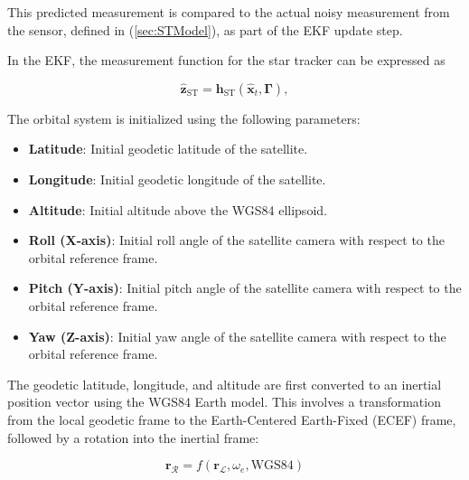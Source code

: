\noindent This predicted measurement is compared to the actual noisy measurement from the sensor, defined in (\ref{sec:STModel}), as part of the EKF update step.
\vspace{0.5cm}

\noindent In the EKF, the measurement function for the star tracker can be expressed as

\begin{equation}
    \mathbf{\hat{z}}_{\text{ST}} = \mathbf{h}_{\text{ST}}(\mathbf{\hat{x}}_t, \boldsymbol{\Gamma}),
\end{equation}


The orbital system is initialized using the following parameters:

\begin{itemize}
    \item \textbf{Latitude}: Initial geodetic latitude of the satellite.
    \item \textbf{Longitude}: Initial geodetic longitude of the satellite.
    \item \textbf{Altitude}: Initial altitude above the WGS84 ellipsoid.
    \item \textbf{Roll (X-axis)}: Initial roll angle of the satellite camera with respect to the orbital reference frame.
    \item \textbf{Pitch (Y-axis)}: Initial pitch angle of the satellite camera with respect to the orbital reference frame.
    \item \textbf{Yaw (Z-axis)}: Initial yaw angle of the satellite camera with respect to the orbital reference frame.
\end{itemize}


\noindent
The geodetic latitude, longitude, and altitude are first converted to an inertial position vector using the WGS84 Earth model. This involves a transformation 
from the local geodetic frame to the Earth-Centered Earth-Fixed (ECEF) frame, followed by a rotation into the inertial frame:

\begin{equation}
    \mathbf{r}_\mathcal{R} = f(\mathbf{r}_\mathcal{L},\omega_e,\text{WGS84})
\end{equation}

